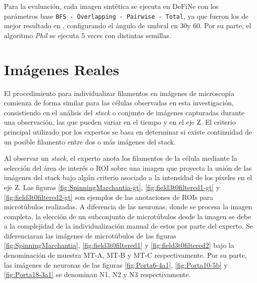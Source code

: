Para la evaluaci\'on, cada imagen sint\'etica se ejecuta en DeFiNe con los par\'ametros base {\tt BFS - Overlapping - Pairwise - Total}, ya que fueron los de mejor resultado en \cite{breuer2015define}, configurando el \'angulo de umbral en 30\textdegree y 60\textdegree. Por su parte, el algoritmo {\it Phil} se ejecuta 5 veces con distintas semillas.

\section{Im\'agenes Reales}
El procedimiento para individualizar filamentos en im\'agenes de microscop\'ia
comienza de forma similar para las c\'elulas observadas en esta investigaci\'on, consistiendo en el an\'alisis del {\it stack} o conjunto de im\'agenes capturadas durante una observaci\'on, las que pueden variar en el tiempo y en el eje Z. El criterio principal utilizado por los expertos se basa en determinar si existe continuidad de un posible filamento entre dos o m\'as im\'agenes del stack. %

Al observar un {\it stack}, el experto anota los filamentos de la c\'elula mediante la selecci\'on del \'area de inter\'es o ROI sobre una imagen que proyecta la uni\'on de las im\'agenes del stack bajo alg\'un criterio asociado a la intensidad de los p\'ixeles en el eje Z. Las figuras \ref{fig:SpinningMarchantia-gt}, \ref{fig:field3t0filtered1-gt} y \ref{fig:field3t0filtered2-gt} son ejemplos de las anotaciones de ROIs para microt\'ubulos realizadas. A diferencia de las neuronas, donde se procesa la imagen completa, la elecci\'on de un subconjunto de microt\'ubulos desde la imagen se debe a la complejidad de la individualizaci\'on manual de estos por parte del experto. Se diferenciaran las im\'agenes de microt\'ubulos de las figuras \ref{fig:SpinningMarchantia}, \ref{fig:field3t0filtered1} y \ref{fig:field3t0filtered2} bajo la denominaci\'on de muestra MT-A, MT-B y MT-C respectivamente. Por su parte, las im\'agenes de neuronas de las figuras \ref{fig:Porta6-4a1}, \ref{fig:Porta10-5b} y \ref{fig:Porta18-3a1}  se denominan N1, N2 y N3 respectivamente.

